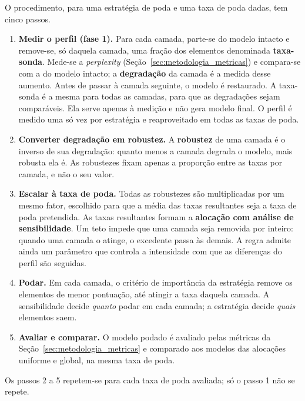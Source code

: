 O procedimento, para uma estratégia de poda e uma taxa de poda dadas, tem cinco passos.

\begin{enumerate}
    \item \textbf{Medir o perfil (fase 1).} Para cada camada, parte-se do modelo intacto e
          remove-se, só daquela camada, uma fração dos elementos denominada
          \textbf{taxa-sonda}. Mede-se a \textit{perplexity} (Seção~\ref{sec:metodologia_metricas})
          e compara-se com a do modelo intacto; a \textbf{degradação} da camada é a medida desse
          aumento. Antes de passar à camada seguinte, o modelo é restaurado. A taxa-sonda é
          a mesma para todas as camadas, para que as degradações sejam comparáveis. Ela serve
          apenas à medição e não gera modelo final. O perfil é medido uma só vez por
          estratégia e reaproveitado em todas as taxas de poda.
    \item \textbf{Converter degradação em robustez.} A \textbf{robustez} de uma camada é o
          inverso de sua degradação: quanto menos a camada degrada o modelo, mais robusta
          ela é. As robustezes fixam apenas a proporção entre as taxas por camada, e não o
          seu valor.
    \item \textbf{Escalar à taxa de poda.} Todas as robustezes são multiplicadas por um
          mesmo fator, escolhido para que a média das taxas resultantes seja a taxa de poda
          pretendida. As taxas resultantes formam a \textbf{alocação com análise
          de sensibilidade}. Um teto impede que uma camada seja removida por inteiro: quando
          uma camada o atinge, o excedente passa às demais. A regra admite ainda um
          parâmetro que controla a intensidade com que as diferenças do perfil são seguidas.
    \item \textbf{Podar.} Em cada camada, o critério de importância da estratégia remove os
          elementos de menor pontuação, até atingir a taxa daquela camada. A sensibilidade
          decide \textit{quanto} podar em cada camada; a estratégia decide \textit{quais}
          elementos saem.
    \item \textbf{Avaliar e comparar.} O modelo podado é avaliado pelas métricas da
          Seção~\ref{sec:metodologia_metricas} e comparado aos modelos das alocações
          uniforme e global, na mesma taxa de poda.
\end{enumerate}

Os passos 2 a 5 repetem-se para cada taxa de poda avaliada; só o passo 1 não se repete.


